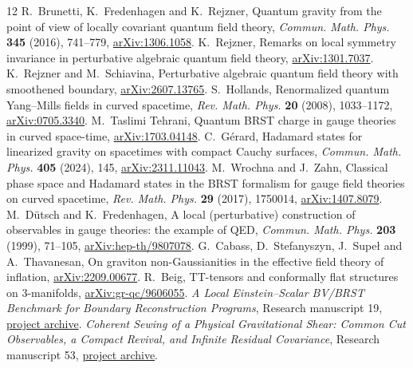 \begin{thebibliography}{12}
R.~Brunetti, K.~Fredenhagen and K.~Rejzner,
Quantum gravity from the point of view of locally covariant quantum field theory,
\emph{Commun. Math. Phys.} \textbf{345} (2016), 741--779,
\href{https://arxiv.org/abs/1306.1058}{arXiv:1306.1058}.
K.~Rejzner, Remarks on local symmetry invariance in perturbative algebraic quantum field theory,
\href{https://arxiv.org/abs/1301.7037}{arXiv:1301.7037}.
K.~Rejzner and M.~Schiavina, Perturbative algebraic quantum field theory with smoothened boundary,
\href{https://arxiv.org/abs/2607.13765}{arXiv:2607.13765}.
S.~Hollands, Renormalized quantum Yang--Mills fields in curved spacetime,
\emph{Rev. Math. Phys.} \textbf{20} (2008), 1033--1172,
\href{https://arxiv.org/abs/0705.3340}{arXiv:0705.3340}.
M.~Taslimi Tehrani, Quantum BRST charge in gauge theories in curved space-time,
\href{https://arxiv.org/abs/1703.04148}{arXiv:1703.04148}.
C.~G\'erard, Hadamard states for linearized gravity on spacetimes with compact Cauchy surfaces,
\emph{Commun. Math. Phys.} \textbf{405} (2024), 145,
\href{https://arxiv.org/abs/2311.11043}{arXiv:2311.11043}.
M.~Wrochna and J.~Zahn, Classical phase space and Hadamard states in the BRST formalism for gauge field theories on curved spacetime,
\emph{Rev. Math. Phys.} \textbf{29} (2017), 1750014,
\href{https://arxiv.org/abs/1407.8079}{arXiv:1407.8079}.
M.~D\"utsch and K.~Fredenhagen, A local (perturbative) construction of observables in gauge theories: the example of QED,
\emph{Commun. Math. Phys.} \textbf{203} (1999), 71--105,
\href{https://arxiv.org/abs/hep-th/9807078}{arXiv:hep-th/9807078}.
G.~Cabass, D.~Stefanyszyn, J.~Supe\l{} and A.~Thavanesan,
On graviton non-Gaussianities in the effective field theory of inflation,
\href{https://arxiv.org/abs/2209.00677}{arXiv:2209.00677}.
R.~Beig, TT-tensors and conformally flat structures on \(3\)-manifolds,
\href{https://arxiv.org/abs/gr-qc/9606055}{arXiv:gr-qc/9606055}.
\emph{A Local Einstein--Scalar BV/BRST Benchmark for Boundary Reconstruction Programs},
Research manuscript 19,
\href{https://github.com/g3173028019-beep/ai-automated-quantum-gravity-research/tree/main/papers/19-local-gauge-benchmarks}{project archive}.
\emph{Coherent Sewing of a Physical Gravitational Shear: Common Cut Observables, a Compact Revival, and Infinite Residual Covariance},
Research manuscript 53,
\href{https://github.com/g3173028019-beep/ai-automated-quantum-gravity-research/tree/main/papers/53-coherent-quantum-shear-sewing}{project archive}.
\end{thebibliography}

